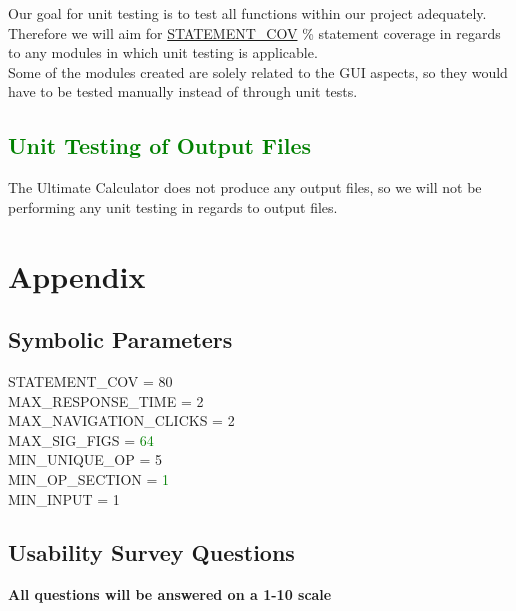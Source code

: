 \documentclass[12pt, titlepage]{article}
\begin{document}
\noindent{}Our goal for unit testing is to test all functions within our project adequately. Therefore we will aim for \hyperref[sec:sp]{STATEMENT\_COV} \% statement coverage in regards to any modules in which unit testing is applicable.\\

\noindent{}Some of the modules created are solely related to the GUI aspects, so they would have to be tested manually instead of through unit tests.
\subsection{\textcolor{Green}{Unit Testing of Output Files}}
The Ultimate Calculator does not produce any output files, so we will not be performing any unit testing in regards to output files.





\newpage

\section{Appendix}


\subsection{Symbolic Parameters}
\label{sec:sp}
STATEMENT\_COV = 80\\
MAX\_RESPONSE\_TIME = 2\\
MAX\_NAVIGATION\_CLICKS = 2\\
MAX\_SIG\_FIGS = \textcolor{Green}{64}\\
MIN\_UNIQUE\_OP = 5\\
MIN\_OP\_SECTION = \textcolor{Green}{1}\\
MIN\_INPUT = 1\\

\subsection{Usability Survey Questions}
\label{sec:survey}

\textbf{All questions will be answered on a 1-10 scale}
\end{document}
